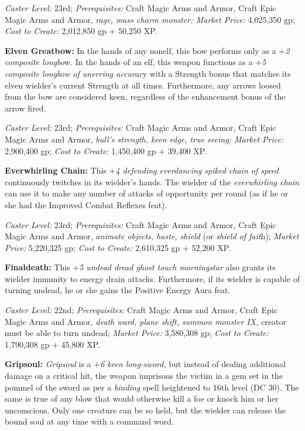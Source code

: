 \documentclass{article}
\begin{document}
\textit{Caster Level: }23rd; \textit{Prerequisites: }Craft Magic Arms and Armor, 
Craft Epic Magic Arms and Armor, \textit{rage, mass charm monster; Market Price: 
}4,025,350 gp; \textit{Cost to Create: }2,012,850 gp + 50,250 XP. 

\textbf{Elven Greatbow: }In the hands of any nonelf, this bow performs only as 
a +\textit{2 composite longbo}w. In the hands of an elf, this weapon functions 
as a +\textit{5 composite longbow of unerring accurac}y with a Strength bonus that 
matches its elven wielder's current Strength at all times. Furthermore, any arrows 
loosed from the bow are considered keen, regardless of the enhancement bonus of 
the arrow fired. 

\textit{Caster Level: }23rd; \textit{Prerequisites: }Craft Magic Arms and Armor, 
Craft Epic Magic Arms and Armor, \textit{bull's strength, keen edge, true seeing; 
Market Price: }2,900,400 gp; \textit{Cost to Create: }1,450,400 gp + 39,400 XP. 

\textbf{Everwhirling Chain: }This +\textit{4 defending everdancing spiked chain 
of speed }continuously twitches in its wielder's hands. The wielder of the \textit{everwhirling 
chain }can use it to make any number of attacks of opportunity per round (as if 
he or she had the Improved Combat Reflexes feat).

\textit{Caster Level: }23rd; \textit{Prerequisites: }Craft Magic Arms and Armor, 
Craft Epic Magic Arms and Armor, \textit{animate objects, haste, shield }(or \textit{shield 
of fait}h); \textit{Market Price: }5,220,325 gp; \textit{Cost to Create: }2,610,325 
gp + 52,200 XP. 

\textbf{Finaldeath: }This +\textit{5 undead dread ghost touch morningstar }also 
grants its wielder immunity to energy drain attacks. Furthermore, if its wielder 
is capable of turning undead, he or she gains the Positive Energy Aura feat.

\textit{Caster Level: }22nd; \textit{Prerequisites: }Craft Magic Arms and Armor, 
Craft Epic Magic Arms and Armor, \textit{death ward, plane shift, summon monster 
IX, }creator must be able to turn undead; \textit{Market Price: }3,580,308 gp; 
\textit{Cost to Create: }1,790,308 gp + 45,800 XP. 

\textbf{Gripsoul: }\textit{Gripsoul }is a +\textit{6 keen long-sword, }but instead 
of dealing additional damage on a critical hit, the weapon imprisons the victim 
in a gem set in the pommel of the sword as per a \textit{binding }spell heightened 
to 16th level (DC 30). The same is true of any blow that would otherwise kill a 
foe or knock him or her unconscious. Only one creature can be so held, but the 
wielder can release the bound soul at any time with a command word. 
\end{document}
